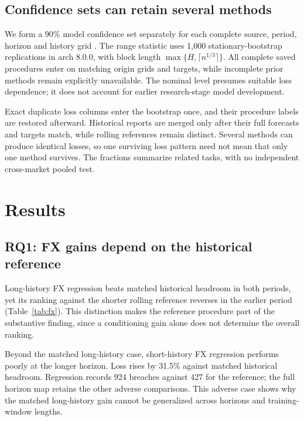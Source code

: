 \documentclass[11pt,a4paper]{article}
\begin{document}
\subsection{Confidence sets can retain several methods}

We form a 90\% model confidence set separately for each complete source, period, horizon and history grid \citep{mcs2011}. The range statistic uses 1,000 stationary-bootstrap replications in arch 8.0.0, with block length $\max\{H,\lceil n^{1/3}\rceil\}$. All complete saved procedures enter on matching origin grids and targets, while incomplete prior methods remain explicitly unavailable. The nominal level presumes suitable loss dependence; it does not account for earlier research-stage model development.

Exact duplicate loss columns enter the bootstrap once, and their procedure labels are restored afterward. Historical reports are merged only after their full forecasts and targets match, while rolling references remain distinct. Several methods can produce identical losses, so one surviving loss pattern need not mean that only one method survives. The fractions summarize related tasks, with no independent cross-market pooled test.

\FloatBarrier

\section{Results}\label{sec:results}

\subsection{RQ1: FX gains depend on the historical reference}\label{sec:rq1}

Long-history FX regression beats matched historical headroom in both periods, yet its ranking against the shorter rolling reference reverses in the earlier period (Table~\ref{tab:fx}). This distinction makes the reference procedure part of the substantive finding, since a conditioning gain alone does not determine the overall ranking.

Beyond the matched long-history case, short-history FX regression performs poorly at the longer horizon. Loss rises by 31.5\% against matched historical headroom. Regression records 924 breaches against 427 for the reference; the full horizon map retains the other adverse comparisons. This adverse case shows why the matched long-history gain cannot be generalized across horizons and training-window lengths.
\end{document}
